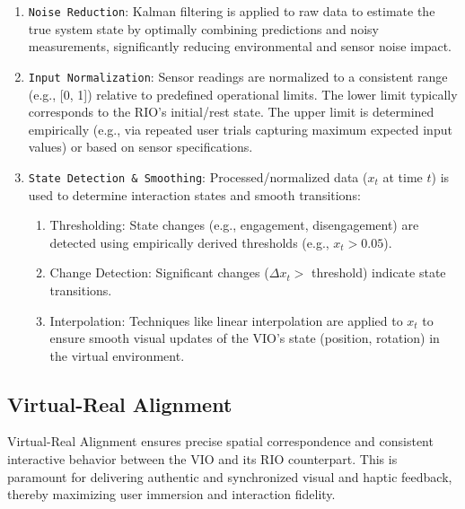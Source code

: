 \documentclass[runningheads]{llncs}
\begin{document}
\begin{enumerate}
  \item \texttt{Noise Reduction}: Kalman filtering is applied to raw data to estimate the true system state by optimally combining predictions and noisy measurements, significantly reducing environmental and sensor noise impact.

  \item \texttt{Input Normalization}: Sensor readings are normalized to a consistent range (e.g., [0, 1]) relative to predefined operational limits. The lower limit typically corresponds to the RIO's initial/rest state. The upper limit is determined empirically (e.g., via repeated user trials capturing maximum expected input values) or based on sensor specifications.

  \item \texttt{State Detection \& Smoothing}: Processed/normalized data ($x_t$ at time $t$) is used to determine interaction states and smooth transitions:
  
  \begin{enumerate}
    \item Thresholding: State changes (e.g., engagement, disengagement) are detected using empirically derived thresholds (e.g., $x_t > 0.05$).

    \item Change Detection: Significant changes ($\Delta x_t >$ threshold) indicate state transitions.

    \item Interpolation: Techniques like linear interpolation are applied to $x_t$ to ensure smooth visual updates of the VIO's state (position, rotation) in the virtual environment.
  \end{enumerate}

\end{enumerate}

\subsection{Virtual-Real Alignment}
Virtual-Real Alignment ensures precise spatial correspondence and consistent interactive behavior between the VIO and its RIO counterpart. This is paramount for delivering authentic and synchronized visual and haptic feedback, thereby maximizing user immersion and interaction fidelity.
\end{document}
